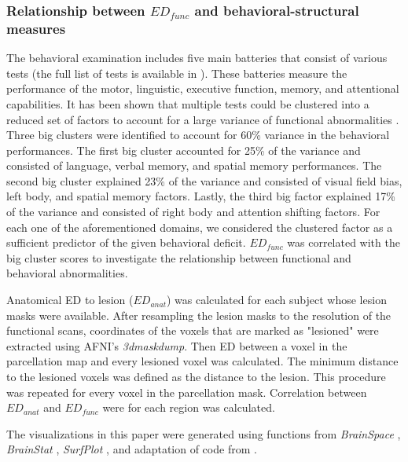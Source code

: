 \documentclass[fleqn,10pt]{wlscirep}
\begin{document}
\subsubsection*{Relationship between $\textit{ED}_{{func}}$ and behavioral-structural measures}

The behavioral examination includes five main batteries that consist of various tests (the full list of tests is available in \cite{corbetta2015common}). These batteries measure the performance of the motor, linguistic, executive function, memory, and attentional capabilities. It has been shown that multiple tests could be clustered into a reduced set of factors to account for a large variance of functional abnormalities \citep{corbetta2015common}. Three big clusters were identified to account for 60\% variance in the behavioral performances. The first big cluster accounted for 25\% of the variance and consisted of language, verbal memory, and spatial memory performances. The second big cluster explained 23\% of the variance and consisted of visual field bias, left body, and spatial memory factors. Lastly, the third big factor explained 17\% of the variance and consisted of right body and attention shifting factors. For each one of the aforementioned domains, we considered the clustered factor as a sufficient predictor of the given behavioral deficit. $\textit{ED}_{{func}}$ was correlated with the big cluster scores to investigate the relationship between functional and behavioral abnormalities.  

Anatomical ED to lesion ($\textit{ED}_{{anat}}$) was calculated for each subject whose lesion masks were available. After resampling the lesion masks to the resolution of the functional scans, coordinates of the voxels that are marked as "lesioned" were extracted using AFNI's \emph{3dmaskdump}. Then ED between a voxel in the parcellation map and every lesioned voxel was calculated. The minimum distance to the lesioned voxels was defined as the distance to the lesion. This procedure was repeated for every voxel in the parcellation mask. Correlation between $\textit{ED}_{{anat}}$ and $\textit{ED}_{{func}}$ were for each region was calculated.  %


The visualizations in this paper were generated using functions from \emph{BrainSpace} \citep{vos2020brainspace}, \emph{BrainStat}  \citep{worsley2009matlab}, \emph{SurfPlot} \citep{gale2021surfplot}, and adaptation of code from \citet{bayrakgithub}.
\end{document}
